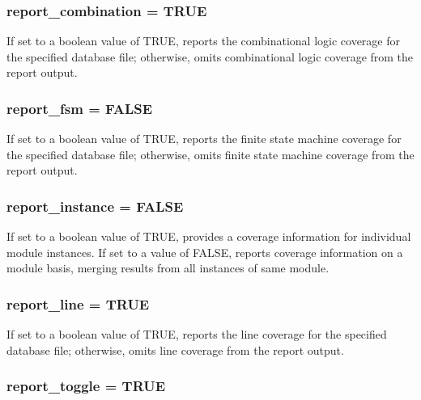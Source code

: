 \subsubsection{ report\_\-combination = TRUE}\label{report_8c_a2}


If set to a boolean value of TRUE, reports the combinational logic coverage for the specified database file; otherwise, omits combinational logic coverage from the report output. 
\subsubsection{ report\_\-fsm = FALSE}\label{report_8c_a3}


If set to a boolean value of TRUE, reports the finite state machine coverage for the specified database file; otherwise, omits finite state machine coverage from the report output. 
\subsubsection{ report\_\-instance = FALSE}\label{report_8c_a5}


If set to a boolean value of TRUE, provides a coverage information for individual module instances. If set to a value of FALSE, reports coverage information on a module basis, merging results from all instances of same module. 
\subsubsection{ report\_\-line = TRUE}\label{report_8c_a0}


If set to a boolean value of TRUE, reports the line coverage for the specified database file; otherwise, omits line coverage from the report output. 
\subsubsection{ report\_\-toggle = TRUE}\label{report_8c_a1}


